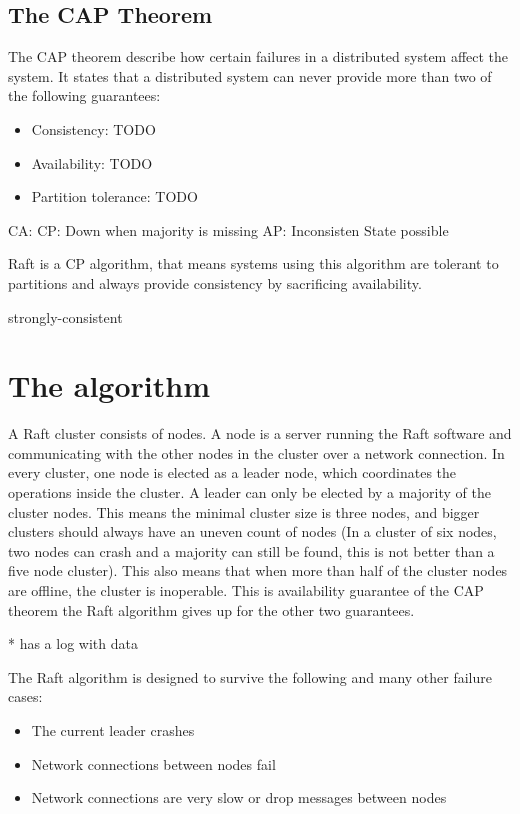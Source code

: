 \subsection{The CAP Theorem}

The CAP theorem describe how certain failures in a distributed system affect the system. It states that a distributed system can never provide more than two of the following guarantees:



\begin{itemize}
    \item Consistency: TODO
    \item Availability: TODO
    \item Partition tolerance: TODO
\end{itemize}


CA: 
CP: Down when majority is missing
AP: Inconsisten State possible

Raft is a CP algorithm, that means systems using this algorithm are tolerant to partitions and always provide consistency by sacrificing availability. 

strongly-consistent

\section{The algorithm}
A Raft cluster consists of nodes. A node is a server running the Raft software and communicating with the other nodes in the cluster over a network connection.
In every cluster, one node is elected as a leader node, which coordinates the operations inside the cluster. A leader can only be elected by
a majority of the cluster nodes. This means the minimal cluster size is three nodes, and bigger clusters should always have an uneven count of nodes (In a cluster
of six nodes, two nodes can crash and a majority can still be found, this is not better than a five node cluster).
This also means that when more than half of the cluster nodes are offline, the cluster is inoperable. This is availability guarantee of the CAP theorem the Raft algorithm gives up
for the other two guarantees. 

* has a log with data

The Raft algorithm is designed to survive the following and many other failure cases:
\begin{itemize}
    \item The current leader crashes
    \item Network connections between nodes fail
    \item Network connections are very slow or drop messages between nodes
\end{itemize}

